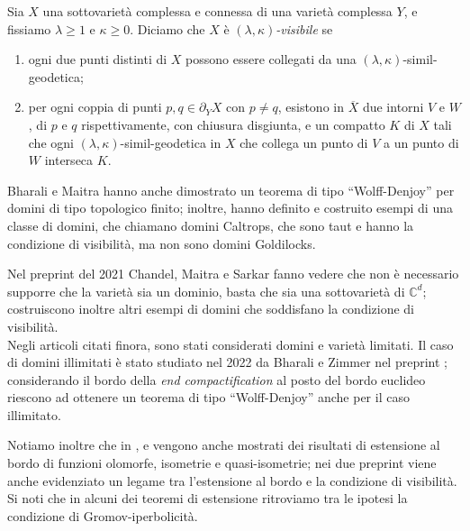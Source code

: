 \begin{defn*}
    Sia $X$ una sottovarietà complessa e connessa di una varietà complessa $Y$, e fissiamo $\lambda \ge 1$ e $\kappa \ge 0$. Diciamo che $X$ è \textit{$(\lambda,\kappa)$-visibile} se
    \begin{enumerate}
        \item ogni due punti distinti di $X$ possono essere collegati da una $(\lambda,\kappa)$-simil-geodetica;
        \item per ogni coppia di punti $p,q\in\partial_YX$ con $p\not=q$, esistono in $\overline{X}$ due intorni $V$ e $W$, di $p$ e $q$ rispettivamente, con chiusura disgiunta, e un compatto $K$ di $X$ tali che  ogni $(\lambda,\kappa)$-simil-geodetica in $X$ che collega un punto di $V$ a un punto di $W$ interseca $K$.
    \end{enumerate}
\end{defn*}

Bharali e Maitra hanno anche dimostrato un teorema di tipo ``Wolff-Denjoy'' per domini di tipo topologico finito; inoltre, hanno definito e costruito esempi di una classe di domini, che chiamano domini Caltrops, che sono taut e hanno la condizione di visibilità, ma non sono domini Goldilocks.

Nel preprint \cite{CMS} del 2021 Chandel, Maitra e Sarkar fanno vedere che non è necessario supporre che la varietà sia un dominio, basta che sia una sottovarietà di $\mathbb{C}^d$; costruiscono inoltre altri esempi di domini che soddisfano la condizione di visibilità.\\

Negli articoli citati finora, sono stati considerati domini e varietà limitati. Il caso di domini illimitati è stato studiato nel 2022 da Bharali e Zimmer nel preprint \cite{BZ2}; considerando il bordo della \textit{end compactification} al posto del bordo euclideo riescono ad ottenere un teorema di tipo ``Wolff-Denjoy'' anche per il caso illimitato.

Notiamo inoltre che in \cite{BZ1}, \cite{CMS} e \cite{BZ2} vengono anche mostrati dei risultati di estensione al bordo di funzioni olomorfe, isometrie e quasi-isometrie; nei due preprint viene anche evidenziato un legame tra l'estensione al bordo e la condizione di visibilità. Si noti che in alcuni dei teoremi di estensione ritroviamo tra le ipotesi la condizione di Gromov-iperbolicità. \\

